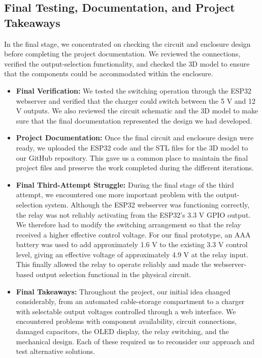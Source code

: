 \documentclass[12pt,a4paper]{article}
\numberwithin{figure}{section}
\begin{document}
\subsection{Final Testing, Documentation, and Project Takeaways}

In the final stage, we concentrated on checking the circuit and enclosure design before completing the project documentation. We reviewed the connections, verified the output-selection functionality, and checked the 3D model to ensure that the components could be accommodated within the enclosure.

\vspace{0.5em}

\begin{itemize}
    \item \textbf{Final Verification:} We tested the switching operation through the ESP32 webserver and verified that the charger could switch between the 5 V and 12 V outputs. We also reviewed the circuit schematic and the 3D model to make sure that the final documentation represented the design we had developed.

    \item \textbf{Project Documentation:} Once the final circuit and enclosure design were ready, we uploaded the ESP32 code and the STL files for the 3D model to our GitHub repository. This gave us a common place to maintain the final project files and preserve the work completed during the different iterations.

    \item \textbf{Final Third-Attempt Struggle:} During the final stage of the third attempt, we encountered one more important problem with the output-selection system. Although the ESP32 webserver was functioning correctly, the relay was not reliably activating from the ESP32's 3.3 V GPIO output. We therefore had to modify the switching arrangement so that the relay received a higher effective control voltage. For our final prototype, an AAA battery was used to add approximately 1.6 V to the existing 3.3 V control level, giving an effective voltage of approximately 4.9 V at the relay input. This finally allowed the relay to operate reliably and made the webserver-based output selection functional in the physical circuit.

    \item \textbf{Final Takeaways:} Throughout the project, our initial idea changed considerably, from an automated cable-storage compartment to a charger with selectable output voltages controlled through a web interface. We encountered problems with component availability, circuit connections, damaged capacitors, the OLED display, the relay switching, and the mechanical design. Each of these required us to reconsider our approach and test alternative solutions.
\end{itemize}
\end{document}
